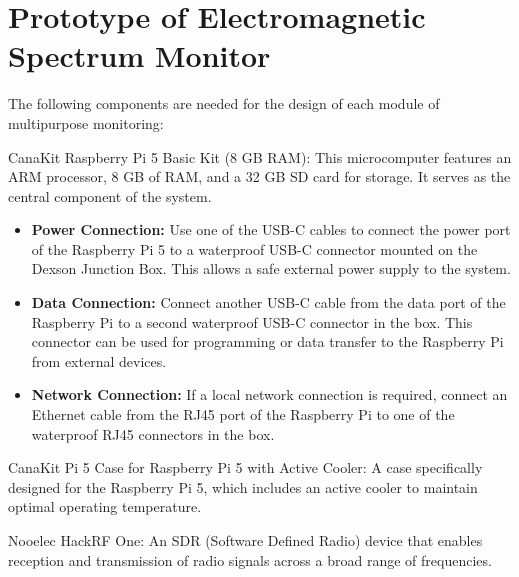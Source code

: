 \section*{Prototype of Electromagnetic Spectrum Monitor}


The following components are needed for the design of each module of multipurpose monitoring:

\begin{list}{*}{}
	
	\item {CanaKit Raspberry Pi 5 Basic Kit (8 GB RAM):} This microcomputer features an ARM processor, 8 GB of RAM, and a 32 GB SD card for storage. It serves as the central component of the system.
	
	\begin{itemize}
		\item \textbf{Power Connection:} Use one of the USB-C cables to connect the power port of the Raspberry Pi 5 to a waterproof USB-C connector mounted on the Dexson Junction Box. This allows a safe external power supply to the system.
		\item \textbf{Data Connection:} Connect another USB-C cable from the data port of the Raspberry Pi to a second waterproof USB-C connector in the box. This connector can be used for programming or data transfer to the Raspberry Pi from external devices.
		\item \textbf{Network Connection:} If a local network connection is required, connect an Ethernet cable from the RJ45 port of the Raspberry Pi to one of the waterproof RJ45 connectors in the box.
	\end{itemize}
	
	\item {CanaKit Pi 5 Case for Raspberry Pi 5 with Active Cooler:} A case specifically designed for the Raspberry Pi 5, which includes an active cooler to maintain optimal operating temperature.
	
	\item {Nooelec HackRF One:} An SDR (Software Defined Radio) device that enables reception and transmission of radio signals across a broad range of frequencies.
	

\end{list}
